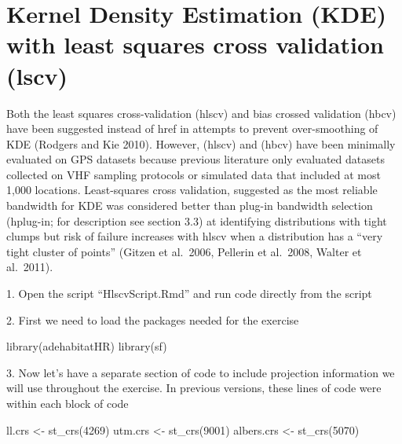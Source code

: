 \documentclass[
  letterpaper,
]{book}
\newenvironment{Shaded}{\begin{snugshade}}{\end{snugshade}}
\newcommand{\DecValTok}[1]{\textcolor[rgb]{0.68,0.00,0.00}{#1}}
\newcommand{\FunctionTok}[1]{\textcolor[rgb]{0.28,0.35,0.67}{#1}}
\newcommand{\NormalTok}[1]{\textcolor[rgb]{0.00,0.23,0.31}{#1}}
\newcommand{\OtherTok}[1]{\textcolor[rgb]{0.00,0.23,0.31}{#1}}
\begin{document}
\hypertarget{kernel-density-estimation-kde-with-least-squares-cross-validation-lscv}{%
\chapter{Kernel Density Estimation (KDE) with least squares cross
validation
(lscv)}\label{kernel-density-estimation-kde-with-least-squares-cross-validation-lscv}}

Both the least squares cross-validation (hlscv) and bias crossed
validation (hbcv) have been suggested instead of href in attempts to
prevent over-smoothing of KDE (Rodgers and Kie 2010). However, (hlscv)
and (hbcv) have been minimally evaluated on GPS datasets because
previous literature only evaluated datasets collected on VHF sampling
protocols or simulated data that included at most 1,000 locations.
Least-squares cross validation, suggested as the most reliable bandwidth
for KDE was considered better than plug-in bandwidth selection
(hplug-in; for description see section 3.3) at identifying distributions
with tight clumps but risk of failure increases with hlscv when a
distribution has a ``very tight cluster of points'' (Gitzen et al.~2006,
Pellerin et al.~2008, Walter et al.~2011).

1. Open the script ``HlscvScript.Rmd'' and run code directly from the
script

2. First we need to load the packages needed for the exercise

\begin{Shaded}
\begin{Highlighting}[]
\FunctionTok{library}\NormalTok{(adehabitatHR)}
\FunctionTok{library}\NormalTok{(sf)}
\end{Highlighting}
\end{Shaded}

3. Now let's have a separate section of code to include projection
information we will use throughout the exercise. In previous versions,
these lines of code were within each block of code

\begin{Shaded}
\begin{Highlighting}[]
\NormalTok{ll.crs }\OtherTok{\textless{}{-}} \FunctionTok{st\_crs}\NormalTok{(}\DecValTok{4269}\NormalTok{)}
\NormalTok{utm.crs }\OtherTok{\textless{}{-}} \FunctionTok{st\_crs}\NormalTok{(}\DecValTok{9001}\NormalTok{)}
\NormalTok{albers.crs }\OtherTok{\textless{}{-}} \FunctionTok{st\_crs}\NormalTok{(}\DecValTok{5070}\NormalTok{)}
\end{Highlighting}
\end{Shaded}
\end{document}
